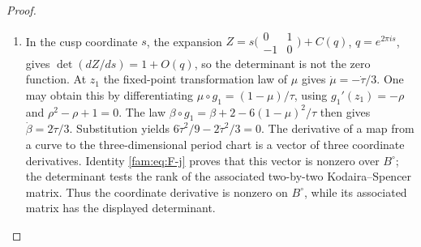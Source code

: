 \begin{proof}
\begin{enumerate}[label=\arabic*.,leftmargin=*]
\item In the cusp coordinate $s$, the expansion
$Z=s\bigl(\begin{smallmatrix}0&1\\-1&0\end{smallmatrix}\bigr)+C(q)$,
$q=e^{2\pi is}$, gives
$\det(dZ/ds)=1+O(q)$, so the determinant is not the zero function.
At $z_1$ the fixed-point transformation law of $\mu$ gives
$\dot\mu=-\dot\tau/3$.  One may obtain this by differentiating
$\mu\circ g_1=(1-\mu)/\tau$, using
$g_1'(z_1)=-\rho$ and $\rho^2-\rho+1=0$.
The law
$\beta\circ g_1=\beta+2-6(1-\mu)^2/\tau$ then gives
$\dot\beta=2\dot\tau/3$.  Substitution yields
$6\dot\tau^2/9-2\dot\tau^2/3=0$.
The derivative of a map from a curve to the three-dimensional period
chart is a vector of three coordinate derivatives.  Identity
\eqref{fam:eq:F-j} proves that this vector is nonzero over $B^\circ$;
the determinant tests the rank of the associated two-by-two
Kodaira--Spencer matrix.  Thus the coordinate derivative is nonzero on $B^\circ$, while its
associated matrix has the displayed determinant.
\end{enumerate}
\end{proof}



